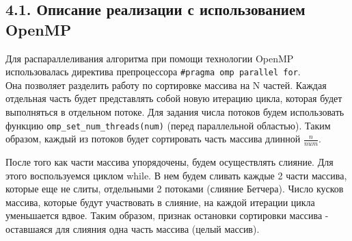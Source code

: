 \documentclass{report}
\begin{document}
\subsection*{4.1. Описание реализации с использованием OpenMP}
\par Для распараллеливания алгоритма при помощи технологии OpenMP использовалась директива препроцессора \verb|#pragma omp parallel for|. \\
Она позволяет разделить работу по сортировке массива на N частей. Каждая отдельная часть будет представлять собой новую итерацию цикла, которая будет выполняться в отдельном потоке. Для задания числа потоков будем использовать функцию \verb|omp_set_num_threads(num)| (перед параллельной областью). Таким образом, каждый из потоков будет сортировать часть массива длинной $\frac{n}{num}$.
\par После того как части массива упорядочены, будем осуществлять слияние. Для этого воспользуемся циклом while. В нем будем сливать каждые 2 части массива, которые еще не слиты, отдельными 2 потоками (слияние Бетчера). Число кусков массива, которые будут участвовать в слияние, на каждой итерации цикла уменьшается вдвое. Таким образом, признак остановки сортировки массива - оставшаяся для слияния одна часть массива (целый массив).
\end{document}
